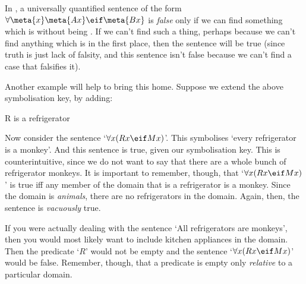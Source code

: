In \FOL, a universally quantified sentence of the form $\forall \meta{x} \meta{Ax} \eif \meta{Bx}$ is \emph{false} only if we can find something which is  without being . If we can't find such a thing, perhaps because we can't find anything which is  in the first place, then the sentence will be true (since truth is just lack of falsity, and this sentence isn't false because we can't find a case that falsifies it). 

Another example will help to bring this home. Suppose we extend the above symbolisation key, by adding:
	\begin{ekey}
		\item[R]  is a refrigerator
	\end{ekey}
Now consider the sentence `$\forall x(Rx \eif Mx)$'. This symbolises `every refrigerator is a monkey'. And this sentence is true, given our symbolisation key. This is counterintuitive, since we do not want to say that there are a whole bunch of refrigerator monkeys. It is important to remember, though, that `$\forall x(Rx \eif Mx)$' is true iff any member of the domain that is a refrigerator is a monkey. Since the domain is \emph{animals}, there are no refrigerators in the domain. Again, then, the sentence is \emph{vacuously} true. 

If you were actually dealing with the sentence `All refrigerators are monkeys', then you would most likely want to include kitchen appliances in the domain. Then the predicate `$R$' would not be empty and the sentence `$\forall x(Rx \eif Mx)$' would be false. Remember, though, that a predicate is empty only \emph{relative} to a particular domain. 


